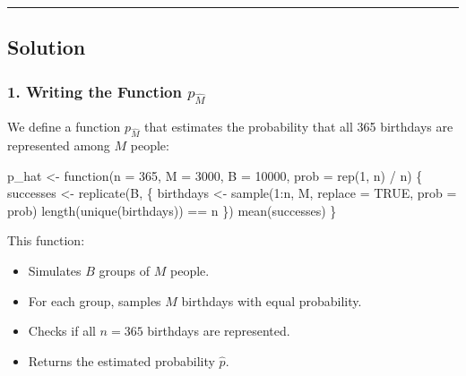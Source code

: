 \documentclass[
  letterpaper,
  DIV=11,
  numbers=noendperiod]{scrartcl}
\newenvironment{Shaded}{\begin{snugshade}}{\end{snugshade}}
\newcommand{\AttributeTok}[1]{\textcolor[rgb]{0.98,0.46,0.51}{#1}}
\newcommand{\ConstantTok}[1]{\textcolor[rgb]{0.47,0.72,1.00}{#1}}
\newcommand{\ControlFlowTok}[1]{\textcolor[rgb]{0.98,0.46,0.51}{#1}}
\newcommand{\DecValTok}[1]{\textcolor[rgb]{0.47,0.72,1.00}{#1}}
\newcommand{\FunctionTok}[1]{\textcolor[rgb]{0.70,0.57,0.94}{#1}}
\newcommand{\NormalTok}[1]{\textcolor[rgb]{0.88,0.89,0.91}{#1}}
\newcommand{\OtherTok}[1]{\textcolor[rgb]{0.70,0.57,0.94}{#1}}
\newcommand{\SpecialCharTok}[1]{\textcolor[rgb]{0.47,0.72,1.00}{#1}}
\providecommand{\tightlist}{%
  \setlength{\itemsep}{0pt}\setlength{\parskip}{0pt}}\usepackage{longtable,booktabs,array}
\begin{document}
\begin{center}\rule{0.5\linewidth}{0.5pt}\end{center}

\subsection{Solution}\label{solution}

\subsubsection{\texorpdfstring{1. Writing the Function
\(p_{\hat{M}}\)}{1. Writing the Function p\_\{\textbackslash hat\{M\}\}}}\label{writing-the-function-p_hatm}

We define a function \(p_{\hat{M}}\) that estimates the probability that
all 365 birthdays are represented among \(M\) people:

\begin{Shaded}
\begin{Highlighting}[]
\NormalTok{p\_hat }\OtherTok{\textless{}{-}} \ControlFlowTok{function}\NormalTok{(}\AttributeTok{n =} \DecValTok{365}\NormalTok{, }\AttributeTok{M =} \DecValTok{3000}\NormalTok{, }\AttributeTok{B =} \DecValTok{10000}\NormalTok{, }\AttributeTok{prob =} \FunctionTok{rep}\NormalTok{(}\DecValTok{1}\NormalTok{, n) }\SpecialCharTok{/}\NormalTok{ n) \{}
\NormalTok{  successes }\OtherTok{\textless{}{-}} \FunctionTok{replicate}\NormalTok{(B, \{}
\NormalTok{    birthdays }\OtherTok{\textless{}{-}} \FunctionTok{sample}\NormalTok{(}\DecValTok{1}\SpecialCharTok{:}\NormalTok{n, M, }\AttributeTok{replace =} \ConstantTok{TRUE}\NormalTok{, }\AttributeTok{prob =}\NormalTok{ prob)}
    \FunctionTok{length}\NormalTok{(}\FunctionTok{unique}\NormalTok{(birthdays)) }\SpecialCharTok{==}\NormalTok{ n}
\NormalTok{  \})}
  \FunctionTok{mean}\NormalTok{(successes)}
\NormalTok{\}}
\end{Highlighting}
\end{Shaded}

This function:

\begin{itemize}
\tightlist
\item
  Simulates \(B\) groups of \(M\) people.
\item
  For each group, samples \(M\) birthdays with equal probability.
\item
  Checks if all \(n = 365\) birthdays are represented.
\item
  Returns the estimated probability \(\hat{p}\).
\end{itemize}
\end{document}
